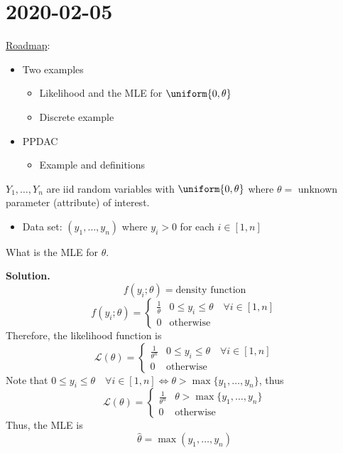 \section{2020-02-05}
\underline{Roadmap}:
\begin{itemize}
    \item Two examples
          \begin{itemize}
              \item Likelihood and the MLE for $ \uniform{0,\theta} $
              \item Discrete example
          \end{itemize}
    \item PPDAC
          \begin{itemize}
              \item Example and definitions
          \end{itemize}
\end{itemize}

\begin{Example}{}{}
    $ Y_1,\ldots ,Y_n $ are iid random variables with $ \uniform{0,\theta} $
    where $ \theta= $ unknown parameter (attribute) of interest.
    \begin{itemize}
        \item Data set: $ (y_1,\ldots ,y_n) $ where $ y_i>0 $ for each $ i\in[1,n] $
    \end{itemize}
    What is the MLE for $ \theta $.

    \textbf{Solution.}
    \[ f(y_i;\theta)=\text{density function} \]
    \[ f(y_i;\theta)=
        \begin{cases}
            \frac{1}{\theta} & 0\leqslant y_i \leqslant \theta\quad\forall i\in[1,n] \\
            0                & \text{otherwise}
        \end{cases} \]
    Therefore, the likelihood function is
    \[ \mathcal{L}(\theta)=
        \begin{cases}
            \frac{1}{\theta^n} & 0\leqslant y_i\leqslant \theta\quad\forall i\in[1,n] \\
            0                  & \text{otherwise}
        \end{cases} \]
    Note that $ 0\leqslant y_i\leqslant \theta\quad\forall i\in[1,n]\iff
        \theta>\max\{y_1,\ldots ,y_n\} $, thus
    \[ \mathcal{L}(\theta)=
        \begin{cases}
            \frac{1}{\theta^n} & \theta>\max \{y_1,\ldots ,y_n\} \\
            0                  & \text{otherwise}
        \end{cases} \]
    Thus, the MLE is
    \[ \hat{\theta}=\max(y_1,\ldots ,y_n) \]
\end{Example}



